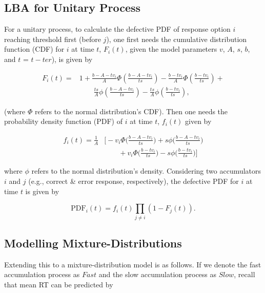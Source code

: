 \documentclass[a4paper, man, natbib]{apa6}
\begin{document}
\subsection{LBA for Unitary Process}
For a unitary process, to calculate the defective PDF of response option $i$ reaching threshold first (before $j$), one first needs the cumulative distribution function (CDF) for $i$ at time $t$, $F_{i}(t)$, given the model parameters $v$, $A$, $s$, $b$, and $t$ = $t - ter$), is given by


\begin{equation}
\begin{aligned}
F_{i}(t) = & 1 + \frac{b - A - tv_{i}}{A} \Phi\left(\frac{b - A - tv_{i}}{ts}\right) - 
\frac{b - tv_{i}}{A} \Phi\left(\frac{b - tv_{i}}{ts}\right) + \\ 
&\qquad \frac{ts}{A} \phi \left(\frac{b - A - tv_{i}}{ts}\right) - \frac{ts}{A} \phi \left(\frac{b - tv_{i}}{ts}\right),
\end{aligned}
\label{eq:lbaCDF}
\end{equation}

\noindent (where $\Phi$ refers to the normal distribution's CDF). Then one needs the probability density function (PDF) of $i$ at time $t$, $f_{i}(t)$ given by  

\begin{equation}
\begin{aligned}
f_{i}(t) = \frac{1}{A} & \Biggl[-v_{i}\Phi \Biggl(\frac{b - A - tv_{i}}{ts}\Biggr) + s\phi\Biggl(\frac{b - A - tv_{i}}{ts}\Biggr) \\
&\qquad + v_{i}\Phi \Biggl(\frac{b - tv_{i}}{ts}\Biggr) - s\phi\Biggl(\frac{b - tv_{i}}{ts}\Biggr)\Biggr] 
\end{aligned}
\label{eq:lbaPDF}
\end{equation}

\noindent where $\phi$ refers to the normal distribution's density. Considering two accumulators $i$ and $j$ (e.g., correct \& error response, respectively), the defective PDF for $i$ at time $t$ is given by

\begin{equation}
\mbox{PDF}_{i}(t) = f_{i}(t) \prod_{j \neq i} \left(1 - F_{j}(t)\right).
\label{eq:defectivePDF}
\end{equation}


\subsection{Modelling Mixture-Distributions}
Extending this to a mixture-distribution model is as follows. If we denote the fast accumulation process as $Fast$ and the slow accumulation process as $Slow$, recall that mean RT can be predicted by
\end{document}
